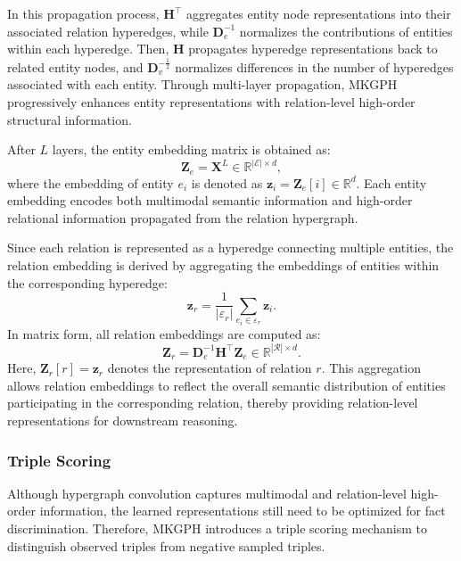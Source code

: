 \documentclass[a4paper,fleqn]{cas-sc}
\begin{document}
In this propagation process, $\mathbf{H}^{\top}$ aggregates entity node representations into their associated relation hyperedges, while $\mathbf{D}_{e}^{-1}$ normalizes the contributions of entities within each hyperedge. Then, $\mathbf{H}$ propagates hyperedge representations back to related entity nodes, and $\mathbf{D}_{v}^{-\frac{1}{2}}$ normalizes differences in the number of hyperedges associated with each entity. Through multi-layer propagation, MKGPH progressively enhances entity representations with relation-level high-order structural information.

After $L$ layers, the entity embedding matrix is obtained as:
\begin{equation}
\mathbf{Z}_{e}=\mathbf{X}^{L}\in\mathbb{R}^{|\mathcal{E}|\times d},
\end{equation}
where the embedding of entity $e_i$ is denoted as $\mathbf{z}_i=\mathbf{Z}_{e}[i]\in\mathbb{R}^{d}$. Each entity embedding encodes both multimodal semantic information and high-order relational information propagated from the relation hypergraph.

Since each relation is represented as a hyperedge connecting multiple entities, the relation embedding is derived by aggregating the embeddings of entities within the corresponding hyperedge:
\begin{equation}
\mathbf{z}_r
=
\frac{1}{|\varepsilon_r|}
\sum_{e_i\in\varepsilon_r}
\mathbf{z}_i.
\end{equation}
In matrix form, all relation embeddings are computed as:
\begin{equation}
\mathbf{Z}_{r}
=
\mathbf{D}_{e}^{-1}
\mathbf{H}^{\top}
\mathbf{Z}_{e}
\in
\mathbb{R}^{|\mathcal{R}|\times d}.
\end{equation}
Here, $\mathbf{Z}_{r}[r]=\mathbf{z}_r$ denotes the representation of relation $r$. This aggregation allows relation embeddings to reflect the overall semantic distribution of entities participating in the corresponding relation, thereby providing relation-level representations for downstream reasoning.

\subsubsection{Triple Scoring}

Although hypergraph convolution captures multimodal and relation-level high-order information, the learned representations still need to be optimized for fact discrimination. Therefore, MKGPH introduces a triple scoring mechanism to distinguish observed triples from negative sampled triples.
\end{document}
